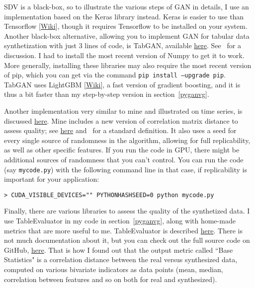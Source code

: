 \documentclass[oneside,10pt]{book}
\begin{document}
SDV is a black-box, so to illustrate the various steps of GAN in details, I use an
implementation based on the Keras library instead.  Keras is easier to use than \textcolor{index}{Tensorflow}
[\href{https://en.wikipedia.org/wiki/TensorFlow}{Wiki}], though it requires Tensorflow to be installed on your system. Another black-box alternative, allowing you to implement GAN for tabular data synthetization with just 3 lines of code, is
\textcolor{index}{TabGAN}, available \href{https://github.com/Diyago/GAN-for-tabular-data}{here}. See~\cite{insaf2020}  for a discussion.
I had to install the most recent version of Numpy to get it to work.  More generally, installing these libraries may also require
 the most recent version of pip, which you can get via the command \texttt{pip install --upgrade pip}. TabGAN uses
\textcolor{index}{LightGBM} [\href{https://en.wikipedia.org/wiki/LightGBM}{Wiki}],
 a fast version of gradient boosting, and it is thus a bit faster than my step-by-step version in section~\ref{pyganvg}.

Another implementation very similar to mine  and illustrated on time series, is
discussed \href{https://towardsdatascience.com/hands-on-generative-adversarial-networks-gan-for-signal-processing-with-python-ff5b8d78bd28}{here}. Mine includes a new version of \textcolor{index}{correlation matrix distance} to assess quality;
see \href{https://www.researchgate.net/publication/4194743_Correlation_Matrix_Distance_a_Meaningful_Measure_for_Evaluation_of_Non-Stationary_MIMO_Channels}{here} and~\cite{pcdxzaw} for a standard definition.
It also uses a seed for every single source of randomness in the algorithm, allowing for full replicability, as well as other specific features. If you run the code in GPU, there
 might be additional sources of randomness that you can't control. You can run the code (say \texttt{mycode.py}) with the following command line in that case, if replicability is important for your application:

 \texttt{> CUDA\_VISIBLE\_DEVICES="" PYTHONHASHSEED=0 python mycode.py}

\noindent Finally, there are various libraries to assess the quality of the synthetized data. I use TableEvaluator in my code
 in section~\ref{pyganvg}, along
 with home-made metrics that are more useful to me. TableEvaluator is described \href{https://pypi.org/project/table-evaluator/}{here}. There is not much documentation about it, but you can check out the full source code on GitHub, \href{https://github.com/Baukebrenninkmeijer/table-evaluator/blob/master/table_evaluator/table_evaluator.py}{here}. That is how I found out that the output metric  called
``Base Statistics" is a correlation distance between the real versus synthesized data, computed on various bivariate indicators as data points (mean, median, correlation between features and so on both for real and synthesized).
\end{document}
